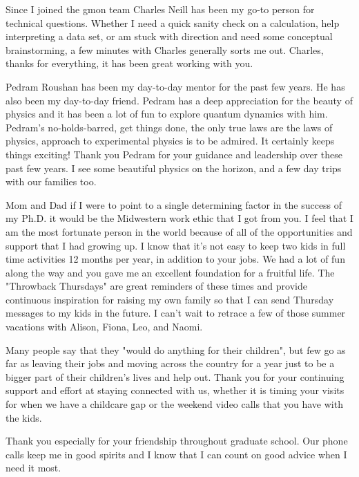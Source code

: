 \begin{acknowledgements}
Since I joined the gmon team Charles Neill has been my go-to person for technical questions.
Whether I need a quick sanity check on a calculation, help interpreting a data set, or am stuck with direction and need some conceptual brainstorming, a few minutes with Charles generally sorts me out.
Charles, thanks for everything, it has been great working with you.

Pedram Roushan has been my day-to-day mentor for the past few years.
He has also been my day-to-day friend.
Pedram has a deep appreciation for the beauty of physics and it has been a lot of fun to explore quantum dynamics with him.
Pedram's no-holds-barred, get things done, the only true laws are the laws of physics, approach to experimental physics is to be admired.
It certainly keeps things exciting!
Thank you Pedram for your guidance and leadership over these past few years.
I see some beautiful physics on the horizon, and a few day trips with our families too.

Mom and Dad if I were to point to a single determining factor in the success of my Ph.D. it would be the Midwestern work ethic that I got from you.
I feel that I am the most fortunate person in the world because of all of the opportunities and support that I had growing up.
I know that it's not easy to keep two kids in full time activities 12 months per year, in addition to your jobs.
We had a lot of fun along the way and you gave me an excellent foundation for a fruitful life.
The "Throwback Thursdays" are great reminders of these times and provide continuous inspiration for raising my own family so that I can send Thursday messages to my kids in the future.
I can't wait to retrace a few of those summer vacations with Alison, Fiona, Leo, and Naomi.

Many people say that they "would do anything for their children", but few go as far as leaving their jobs and moving across the country for a year just to be a bigger part of their children's lives and help out.
Thank you for your continuing support and effort at staying connected with us,
whether it is timing your visits for when we have a childcare gap or the weekend video calls that you have with the kids.

Thank you especially for your friendship throughout graduate school.
Our phone calls keep me in good spirits and I know that I can count on good advice when I need it most.


\end{acknowledgements}
